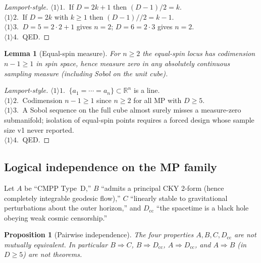 \documentclass[11pt,a4paper]{article}
\newtheorem{lemma}{Lemma}[section]
\newtheorem{proposition}{Proposition}[section]
\begin{document}
\begin{proof}[Lamport-style]
\(\langle1\rangle1.\ \) If \(D=2k+1\) then \((D-1)/2=k\).\\
\(\langle1\rangle2.\ \) If \(D=2k\) with \(k\ge1\) then
\((D-1)//2=k-1\).\\
\(\langle1\rangle3.\ \) \(D=5=2\cdot2+1\) gives \(n=2\); \(D=6=2\cdot3\)
gives \(n=2\).\\
\(\langle1\rangle4.\ \) QED.
\end{proof}

\begin{lemma}[Equal-spin measure]
\label{lem:measure}
For \(n\ge2\) the equal-spin locus has codimension \(n-1\ge1\) in spin
space, hence measure zero in any absolutely continuous sampling measure
(including Sobol on the unit cube).
\end{lemma}

\begin{proof}[Lamport-style]
\(\langle1\rangle1.\ \) \(\{a_1=\cdots=a_n\}\subset\mathbb{R}^n\) is a
line.\\
\(\langle1\rangle2.\ \) Codimension \(n-1\ge1\) since \(n\ge2\) for all
MP with \(D\ge5\).\\
\(\langle1\rangle3.\ \) A Sobol sequence on the full cube almost surely
misses a measure-zero submanifold; isolation of equal-spin points
requires a forced design whose sample size v1 never reported.\\
\(\langle1\rangle4.\ \) QED.
\end{proof}

\subsection{Logical independence on the MP family}

Let \(A\) be ``CMPP Type~D,'' \(B\) ``admits a principal CKY 2-form
(hence completely integrable geodesic flow),'' \(C\) ``linearly stable
to gravitational perturbations about the outer horizon,'' and
\(D_{\mathrm{cc}}\) ``the spacetime is a black hole obeying weak cosmic
censorship.''

\begin{proposition}[Pairwise independence]
\label{prop:indep}
The four properties \(A,B,C,D_{\mathrm{cc}}\) are not mutually
equivalent. In particular \(B\Rightarrow C\), \(B\Rightarrow D_{\mathrm{cc}}\),
\(A\Rightarrow D_{\mathrm{cc}}\), and \(A\Rightarrow B\) (in \(D\ge5\))
are not theorems.
\end{proposition}
\end{document}
